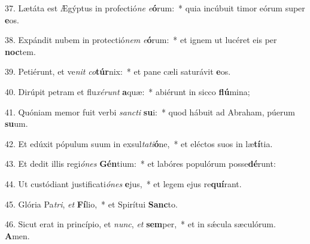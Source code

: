 37. Lætáta est Ægýptus in profectió\textit{ne} \textit{e}\textbf{ó}rum:~*  quia incúbuit timor eórum super \textbf{e}os.\

38. Expándit nubem in protectió\textit{nem} \textit{e}\textbf{ó}rum:~*  et ignem ut lucéret eis per \textbf{noc}tem.\

39. Petiérunt, et ve\textit{nit} \textit{co}\textbf{túr}nix:~*  et pane cæli saturávit \textbf{e}os.\

40. Dirúpit petram et flu\textit{xé}\textit{runt} \textbf{a}quæ:~*  abiérunt in sicco \textbf{flú}mina;\

41. Quóniam memor fuit verbi \textit{sanc}\textit{ti} \textbf{su}i:~*  quod hábuit ad Abraham, púerum \textbf{su}um.\

42. Et edúxit pópulum suum in exsul\textit{ta}\textit{ti}\textbf{ó}ne,~*  et eléctos suos in læ\textbf{tí}tia.\

43. Et dedit illis regi\textit{ó}\textit{nes} \textbf{Gén}tium:~*  et labóres populórum posse\textbf{dé}runt:\

44. Ut custódiant justificati\textit{ó}\textit{nes} \textbf{e}jus,~*  et legem ejus re\textbf{quí}rant.\

45. Glória Pa\textit{tri}, \textit{et} \textbf{Fí}lio,~*  et Spirítui \textbf{Sanc}to.\

46. Sicut erat in princípio, et \textit{nunc}, \textit{et} \textbf{sem}per,~*  et in sǽcula sæculórum. \textbf{A}men.\


